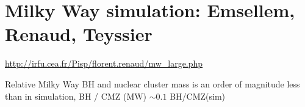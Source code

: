 \section{Milky Way simulation: Emsellem, Renaud, Teyssier}

\url{http://irfu.cea.fr/Pisp/florent.renaud/mw_large.php}

Relative Milky Way BH and nuclear cluster mass is an order of magnitude less than in simulation, BH / CMZ (MW) $\sim0.1$ BH/CMZ(sim)